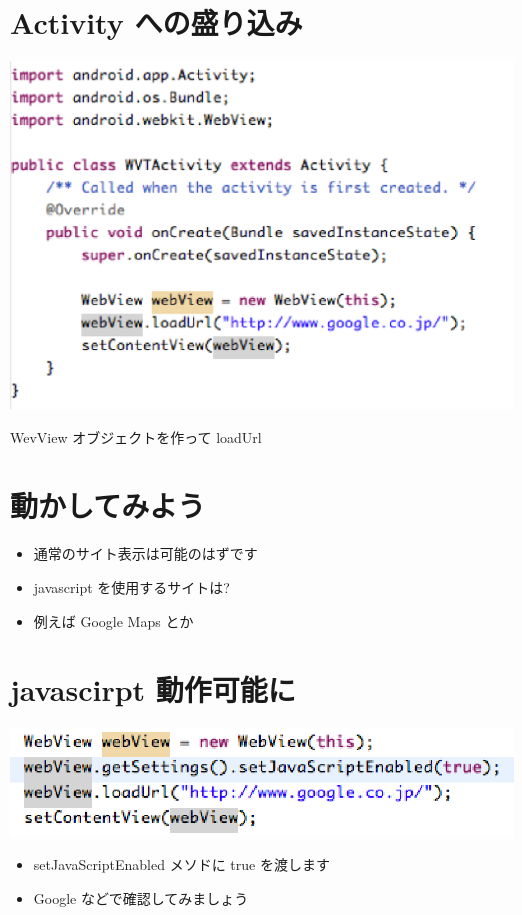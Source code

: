 \documentclass[slide,papersize]{jsarticle}
\begin{document}
\section*{Activity への盛り込み}
\begin{center}
\includegraphics[scale=0.3]{WVTActivity.eps}
\end{center}
WevView オブジェクトを作って loadUrl

\section*{動かしてみよう}
\bigskip
\begin{itemize}
\item 通常のサイト表示は可能のはずです
\medskip
\item javascript を使用するサイトは?
\medskip
\item 例えば Google Maps とか
\end{itemize}

\section*{javascirpt 動作可能に}
\bigskip
\begin{center}
\includegraphics[scale=0.3]{javascriptEnabled.eps}
\end{center}
\begin{itemize}
\item {\footnotesize setJavaScriptEnabled メソドに true を渡します}
\item {\footnotesize Google などで確認してみましょう}
\end{itemize}
\end{document}

